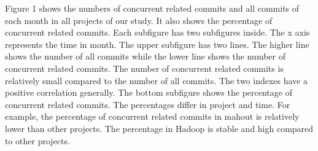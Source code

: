 Figure 1 shows the numbers of concurrent related commits and all commits of each month in all projects of our study. It also shows the percentage of concurrent related commits. Each subfigure has two subfigures inside. The x axis represents the time in month. The upper subfigure has two lines. The higher line shows the number of all commits while the lower line shows the number of concurrent related commits. The number of concurrent related commits is relatively small compared to the number of all commits. The two indexes have a positive correlation generally. The bottom subfigure shows the percentage of concurrent related commits. The percentages differ in project and time. For example, the percentage of concurrent related commits in mahout is relatively lower than other projects. The percentage in Hadoop is stable and high compared to other projects.



